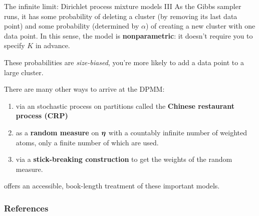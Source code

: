 \documentclass[aspectratio=169]{beamer}
\begin{document}
\begin{frame}{The infinite limit: Dirichlet process mixture models III}
As the Gibbs sampler runs, it has some probability of deleting a cluster (by removing its last data point) and some probability (determined by $\alpha$) of creating a new cluster with one data point. In this sense, the model is \textbf{nonparametric}: it doesn't require you to specify $K$ in advance. 

These probabilities are \textit{size-biased}, you're more likely to add a data point to a large cluster.

There are many other ways to arrive at the DPMM:
\begin{enumerate}
    \item via an stochastic process on partitions called the \textbf{Chinese restaurant process (CRP)}
    \item as a \textbf{random measure} on $\boldsymbol{\eta}$ with a countably infinite number of weighted atoms, only a finite number of which are used.
    \item via a \textbf{stick-breaking construction} to get the weights of the random measure.
\end{enumerate}
\citet{orbanz2012lecture} offers an accessible, book-length treatment of these important models.

\end{frame}


\begin{frame}[t,allowframebreaks]
        \frametitle{References}
        
        
\end{frame}
\end{document}

